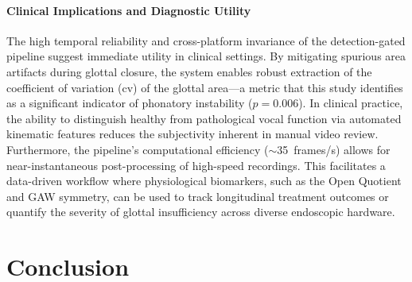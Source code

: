 \documentclass[preprint,12pt]{elsarticle}
\newcommand{\gaw}{GAW}
\begin{document}
\paragraph{Clinical Implications and Diagnostic Utility}
The high temporal reliability and cross-platform invariance of the
detection-gated pipeline suggest immediate utility in clinical settings.
By mitigating spurious area artifacts during glottal closure, the system
enables robust extraction of the coefficient of variation (cv) of the
glottal area---a metric that this study identifies as a significant
indicator of phonatory instability ($p{=}0.006$).
In clinical practice, the ability to distinguish healthy from pathological
vocal function via automated kinematic features reduces the subjectivity
inherent in manual video review.
Furthermore, the pipeline's computational efficiency
(${\sim}$\SI{35}{frames/s}) allows for near-instantaneous post-processing
of high-speed recordings.
This facilitates a data-driven workflow where physiological biomarkers,
such as the Open Quotient and \gaw{} symmetry, can be used to track
longitudinal treatment outcomes or quantify the severity of glottal
insufficiency across diverse endoscopic hardware.

\section{Conclusion}
\label{sec:conclusion}
\end{document}
